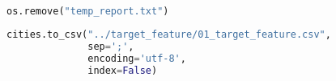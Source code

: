 \begin{lstlisting}[language=Python]
os.remove("temp_report.txt")
\end{lstlisting}

\begin{lstlisting}[language=Python]
cities.to_csv("../target_feature/01_target_feature.csv",
              sep=';',
              encoding='utf-8',
              index=False)
\end{lstlisting}

